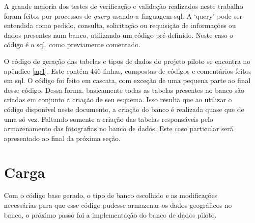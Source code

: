 A grande maioria dos testes de verificação e validação realizados neste trabalho foram feitos por processos de \textit{query} usando a linguagem sql. A `query' pode ser entendida como pedido, consulta, solicitação ou requisição de informações ou dados presentes num banco, utilizando um código pré-definido. Neste caso o código é o sql, como previamente comentado.

O código de geração das tabelas e tipos de dados do projeto piloto se encontra no apêndice \ref{ap1}. Este contém 446 linhas, compostas de códigos e comentários feitos em sql. O código foi feito em cascata, com exceção de uma pequena parte ao final desse código. Dessa forma, basicamente todas as tabelas presentes no banco são criadas em conjunto a criação de seu esquema. Isso resulta que ao utilizar o código disponível neste documento, a criação do banco é realizada quase que de uma só vez. Faltando somente a criação das tabelas responsáveis pelo armazenamento das fotografias no banco de dados. Este caso particular será apresentado ao final da próxima seção. 



\section{Carga}\label{cargs}

Com o código base gerado, o tipo de banco escolhido e as modificações necessárias para que esse código pudesse armazenar os dados geográficos no banco, o próximo passo foi a implementação do banco de dados piloto.

